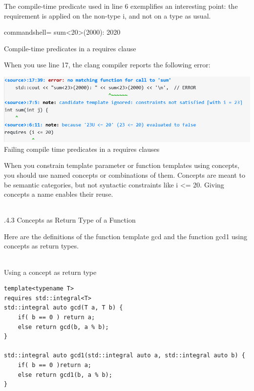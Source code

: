 The compile-time predicate used in line 6 exemplifies an interesting point: the requirement is applied on the non-type i, and not on a type as usual.

\begin{tcblisting}{commandshell={}}
sum<20>(2000): 2020
\end{tcblisting}

\begin{center}
Compile-time predicates in a requires clause
\end{center}

When you use line 17, the clang compiler reports the following error:

\begin{center}
\includegraphics[width=1.0\textwidth]{content/3/chapter4/images/1-2.png}\\
Failing compile time predicates in a requires clauses
\end{center}

\begin{tcolorbox}[colback=blue!5!white,colframe=blue!75!black,title=Avoid Compile-Time Predicates in Requires Clauses]
When you constrain template parameter or function templates using concepts, you should use named concepts or combinations of them. Concepts are meant to be semantic categories, but not syntactic constraints like i <= 20. Giving concepts a name enables their reuse.
\end{tcolorbox}

\hspace*{\fill} \\ %
.4.3\hspace{0.2cm} Concepts as Return Type of a Function

Here are the definitions of the function template gcd and the function gcd1 using concepts as return types.

\hspace*{\fill} \\ %
\noindent
Using a concept as return type
\begin{lstlisting}[style=styleCXX]
template<typename T>
requires std::integral<T>
std::integral auto gcd(T a, T b) {
	if( b == 0 ) return a;
	else return gcd(b, a % b);
}

std::integral auto gcd1(std::integral auto a, std::integral auto b) {
	if( b == 0 )return a;
	else return gcd1(b, a % b);
}
\end{lstlisting}

